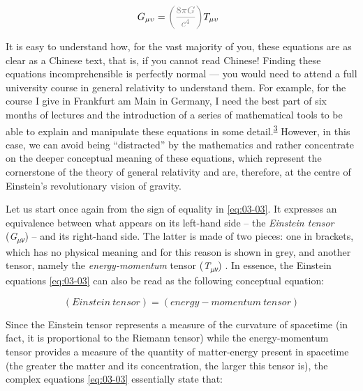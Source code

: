 \begin{equation}\label{eq:03-03}
G_{\mu\upsilon} = \textcolor{gray}{\left( \frac{8\pi G}{c^{4}} \right)}T_{\mu\upsilon\ \ }
\end{equation}

It is easy to understand how, for the vast majority of you, these equations are as clear
as a Chinese text, that is, if you cannot read Chinese! Finding these equations
incomprehensible is perfectly normal --- you would need to attend a full university
course in general relativity to understand them. For example, for
the course I give in Frankfurt am Main in Germany, I need the best part of six months of
lectures and the introduction of a series of mathematical tools to be able to explain
and manipulate these equations in some detail.\textsuperscript{\hyperlink{note:03-03}{3}} However, in this
case, we can avoid being ``distracted'' by the mathematics and rather concentrate on the
deeper conceptual meaning of these equations, which represent the cornerstone of the
theory of general relativity and are, therefore, at the centre of Einstein's
revolutionary vision of gravity.

Let us start once again from the sign of equality in \eqref{eq:03-03}. It expresses an equivalence
between what appears on its left-hand side -- the \emph{Einstein tensor}
 (\emph{G\textsubscript{µν}}) -- and its right-hand side. The latter
is made of two pieces: one in brackets, which has no physical meaning and for this
reason is shown in grey, and another tensor, namely the \emph{energy-momentum} tensor
(\emph{T\textsubscript{µν}}) . In essence, the Einstein equations
\eqref{eq:03-03} can also be read as the following conceptual equation:

\begin{equation}\label{eq:03-04}
(Einstein\ tensor) = (energy - momentum\ tensor)
\end{equation}


Since the Einstein tensor represents a measure of the curvature of spacetime (in fact,
it is proportional to the Riemann tensor) while the energy-momentum tensor provides a
measure of the quantity of matter-energy present in spacetime (the greater the matter
and its concentration, the larger this tensor is), the complex equations \eqref{eq:03-03}
essentially state that:

